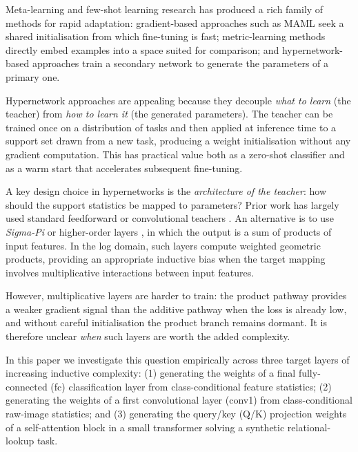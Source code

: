 \documentclass{article}
\begin{document}
Meta-learning and few-shot learning research has produced a rich family of methods for rapid adaptation: gradient-based approaches such as MAML \citep{finn2017maml} seek a shared initialisation from which fine-tuning is fast; metric-learning methods \citep{snell2017prototypical,vinyals2016matching} directly embed examples into a space suited for comparison; and hypernetwork-based approaches \citep{ha2017hypernetworks,bertinetto2016learning} train a secondary network to generate the parameters of a primary one.

Hypernetwork approaches are appealing because they decouple \emph{what to learn} (the teacher) from \emph{how to learn it} (the generated parameters). The teacher can be trained once on a distribution of tasks and then applied at inference time to a support set drawn from a new task, producing a weight initialisation without any gradient computation. This has practical value both as a zero-shot classifier and as a warm start that accelerates subsequent fine-tuning.

A key design choice in hypernetworks is the \emph{architecture of the teacher}: how should the support statistics be mapped to parameters? Prior work has largely used standard feedforward or convolutional teachers \citep{ha2017hypernetworks,ravi2017optimization}. An alternative is to use \emph{Sigma-Pi} or higher-order layers
\citep{rumelhart1986parallel,giles1987highorder,shin1991pisigma}, in which the output is a sum of products of input features. In the log domain, such layers compute weighted geometric products, providing an appropriate inductive bias when the target mapping involves multiplicative interactions between input features.

However, multiplicative layers are harder to train: the product pathway provides a weaker gradient signal than the additive pathway when the loss is already low, and without careful initialisation the product branch remains dormant. It is therefore unclear \emph{when} such layers are worth the added complexity.

In this paper we investigate this question empirically across three target layers of increasing inductive complexity: (1) generating the weights of a final fully-connected (fc) classification layer from class-conditional feature statistics; (2) generating the weights of a first convolutional layer (conv1) from class-conditional raw-image statistics; and (3) generating the query/key (Q/K) projection weights of a self-attention block in a small transformer solving a synthetic relational-lookup task.
\end{document}
